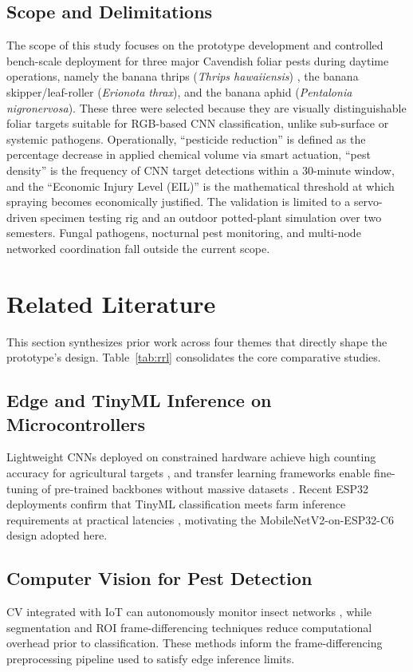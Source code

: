 \documentclass[conference]{IEEEtran}
\begin{document}
\subsection{Scope and Delimitations}
The scope of this study focuses on the prototype development and controlled bench-scale deployment for three major Cavendish foliar pests during daytime operations, namely the banana thrips (\textit{Thrips hawaiiensis}) \cite{reyes2022}, the banana skipper/leaf-roller (\textit{Erionota thrax}), and the banana aphid (\textit{Pentalonia nigronervosa}). %
These three were selected because they are visually distinguishable foliar targets suitable for RGB-based CNN classification, unlike sub-surface or systemic pathogens. Operationally, ``pesticide reduction'' is defined as the percentage decrease in applied chemical volume via smart actuation, ``pest density'' is the frequency of CNN target detections within a 30-minute window, and the ``Economic Injury Level (EIL)'' is the mathematical threshold at which spraying becomes economically justified. The validation is limited to a servo-driven specimen testing rig and an outdoor potted-plant simulation over two semesters. Fungal pathogens, nocturnal pest monitoring, and multi-node networked coordination fall outside the current scope.

\section{Related Literature}
This section synthesizes prior work across four themes that directly shape the prototype's design. Table~\ref{tab:rrl} consolidates the core comparative studies.

\subsection{Edge and TinyML Inference on Microcontrollers}
Lightweight CNNs deployed on constrained hardware achieve high counting accuracy for agricultural targets \cite{bereciartua2023}, and transfer learning frameworks enable fine-tuning of pre-trained backbones without massive datasets \cite{hayajneh2023}. Recent ESP32 deployments confirm that TinyML classification meets farm inference requirements at practical latencies \cite{donskoy2025}, motivating the MobileNetV2-on-ESP32-C6 design adopted here.

\subsection{Computer Vision for Pest Detection}
CV integrated with IoT can autonomously monitor insect networks \cite{cardoso2022}, while segmentation and ROI frame-differencing techniques \cite{singh2022,prasetyo2022,chaudhari2023} reduce computational overhead prior to classification. These methods inform the frame-differencing preprocessing pipeline used to satisfy edge inference limits.
\end{document}
